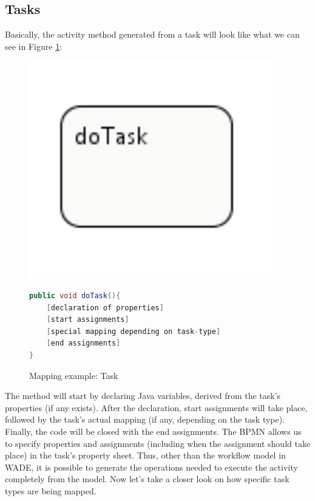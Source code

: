 \subsection{Tasks}
Basically, the activity method generated from a task will look like what we can see in Figure \ref{fig:mapping_task}:

\begin{figure}[h]
\begin{minipage}[c]{0.3\textwidth}
\includegraphics[width=0.95\textwidth]{images/mapping/task.png}
\end{minipage}
\begin{minipage}[c]{0.7\textwidth}
\begin{lstlisting}[language=Java]
public void doTask(){
	[declaration of properties]
	[start assignments]
	[special mapping depending on task-type]
	[end assignments]
}
\end{lstlisting}
\end{minipage}
\caption{Mapping example: Task}%
\label{fig:mapping_task}%
\end{figure}
The method will start by declaring Java variables, derived from the task's properties (if any exists). After the declaration, start assignments will take place, followed by the task's actual mapping (if any, depending on the task type). Finally, the code will be closed with the end assignments. The BPMN allows us to specify properties and assignments (including when the assignment should take place) in the task's property sheet. Thus, other than the workflow model in WADE, it is possible to generate the operations needed to execute the activity completely from the model. Now let's take a closer look on how specific task types are being mapped.\\

